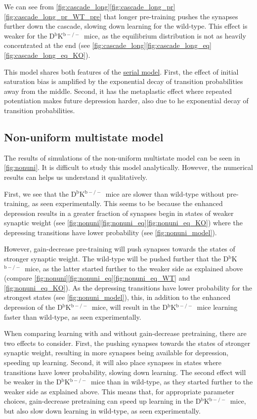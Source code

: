 \documentclass[12pt]{article}
\newcommand{\KO}{D$^\mathrm{b}$K$^{\mathrm{b}-/-}$}
\begin{document}
We can see from \autoref{fig:cascade_long}\ref{fig:cascade_long_pr}\ref{fig:cascade_long_pr_WT_pre} that longer pre-training pushes the synapses further down the cascade, slowing down learning for the wild-type.
This effect is weaker for the \KO\ mice, as the equilibrium distribution is not as heavily concentrated at the end (see \autoref{fig:cascade_long}\ref{fig:cascade_long_eq}\ref{fig:cascade_long_eq_KO}).


This model shares both features of the \hyperref[sec:multistate]{serial model}.
First, the effect of initial saturation bias is amplified by the exponential decay of transition probabilities away from the middle.
Second, it has the metaplastic effect where repeated potentiation makes future depression harder, also due to he exponential decay of transition probabilities.


\subsection{Non-uniform multistate model}\label{sec:nonuni}




The results of simulations of the non-uniform multistate model can be seen in \autoref{fig:nonuni}.
It is difficult to study this model analytically.
However, the numerical results can helps us understand it qualitatively.

First, we see that the \KO\ mice are slower than wild-type without pre-training, as seen experimentally.
This seems to be because the enhanced depression results in a greater fraction of synapses begin in states of weaker synaptic weight (see \autoref{fig:nonuni}\ref{fig:nonuni_eq}\ref{fig:nonuni_eq_KO}) where the depressing transitions have lower probability (see \autoref{fig:nonuni_model}).

However, gain-decrease pre-training will push synapses towards the states of stronger synaptic weight.
The wild-type will be pushed further that the \KO\ mice, as the latter started further to the weaker side as explained above (compare \autoref{fig:nonuni}\ref{fig:nonuni_eq}\ref{fig:nonuni_eq_WT} and \ref{fig:nonuni_eq_KO}).
As the depressing transitions have lower probability for the strongest states (see \autoref{fig:nonuni_model}), this, in addition to the enhanced depression of the \KO\ mice, will result in the \KO\ mice learning faster than wild-type, as seen experimentally.

When comparing learning with and without gain-decrease pretraining, there are two effects to consider.
First, the pushing synapses towards the states of stronger synaptic weight, resulting in more synapses being available for depression, speeding up learning.
Second, it will also place synapses in states where transitions have lower probability, slowing down learning.
The second effect will be weaker in the \KO\ mice than in wild-type, as they started further to the weaker side as explained above.
This means that, for appropriate parameter choices, gain-decrease pretraining can speed up learning in the \KO\ mice, but also slow down learning in wild-type, as seen experimentally.
\end{document}
